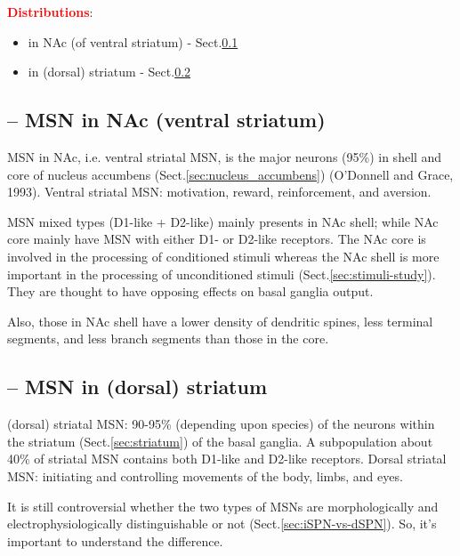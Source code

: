 \textcolor{red}{\bf Distributions}: 
\begin{itemize}
  \item in NAc (of ventral striatum) - Sect.\ref{sec:MSN-in-NAc}
  \item in (dorsal) striatum - Sect.\ref{sec:MSN-in-(dorsal)striatum}
\end{itemize}


\subsection{-- MSN in NAc (ventral striatum)}
\label{sec:MSN-in-NAc}

MSN in NAc, i.e. ventral striatal MSN, is the major neurons (95\%) in shell and
core of nucleus accumbens (Sect.\ref{sec:nucleus_accumbens}) (O'Donnell and
Grace, 1993). Ventral striatal MSN:  motivation, reward, reinforcement, and
aversion.

MSN mixed types (D1-like + D2-like) mainly presents in NAc shell; while NAc core
mainly have MSN with either D1- or D2-like receptors. The NAc core is involved
in the processing of conditioned stimuli whereas the NAc shell is more important
in the processing of unconditioned stimuli (Sect.\ref{sec:stimuli-study}). They
are thought to have opposing effects on basal ganglia output.

Also, those in NAc shell have a lower density of dendritic spines, less terminal
segments, and less branch segments than those in the core.





\subsection{-- MSN in (dorsal) striatum}
\label{sec:MSN-in-(dorsal)striatum}

(dorsal) striatal MSN: 90-95\% (depending upon species) of the neurons within
the striatum (Sect.\ref{sec:striatum}) of the basal ganglia.
A subpopulation about 40\% of striatal MSN contains both D1-like and D2-like
receptors. Dorsal striatal MSN: initiating and controlling movements of the body,
limbs, and eyes.

It is still controversial whether the two types of MSNs are morphologically and
electrophysiologically distinguishable or not (Sect.\ref{sec:iSPN-vs-dSPN}). So,
it's important to understand the difference.

